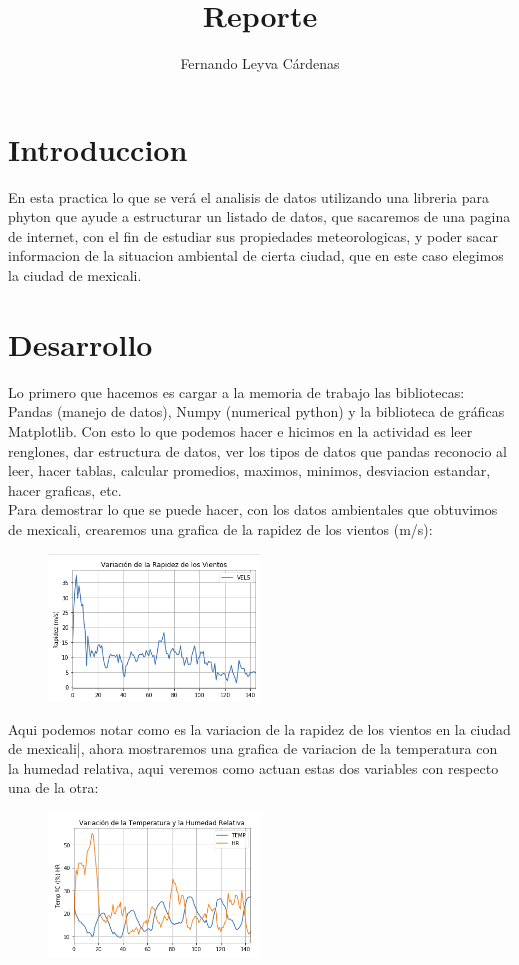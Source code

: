 \documentclass{article}
\title{Reporte}
\author{Fernando Leyva Cárdenas}
\begin{document}
\maketitle
\section{Introduccion}
En esta practica lo que se verá el analisis de datos utilizando una libreria para phyton que ayude a estructurar un listado de datos, que sacaremos de una pagina de internet, con el fin de estudiar sus propiedades meteorologicas, y poder sacar informacion de la situacion ambiental de cierta ciudad, que en este caso elegimos la ciudad de mexicali.
\section{Desarrollo}
Lo primero que hacemos es cargar a la memoria de trabajo las bibliotecas: Pandas (manejo de datos), Numpy (numerical python) y la biblioteca de gráficas Matplotlib. Con esto lo que podemos hacer e hicimos en la actividad es leer renglones, dar estructura de datos, ver los tipos de datos que pandas reconocio al leer, hacer tablas, calcular promedios, maximos, minimos, desviacion estandar, hacer graficas, etc.
\\
Para demostrar lo que se puede hacer, con los datos ambientales que obtuvimos de mexicali, crearemos una grafica de la rapidez de los vientos (m/s):
\begin{figure}[h]
\centering
\includegraphics[width=0.5\textwidth]{ll.png}
\end{figure}

\newpage

Aqui podemos notar como es la variacion de la rapidez de los vientos en la ciudad de mexicali|, ahora mostraremos una grafica de variacion de la temperatura con la humedad relativa, aqui veremos como actuan estas dos variables con respecto una de la otra:
\begin{figure}[h]
\centering
\includegraphics[width=0.5\textwidth]{ee.png}
\end{figure}
\end{document}
